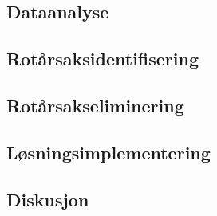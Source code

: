 \subsection{Dataanalyse}


\subsection{Rotårsaksidentifisering}


\subsection{Rotårsakseliminering}


\subsection{Løsningsimplementering}


\subsection{Diskusjon}
